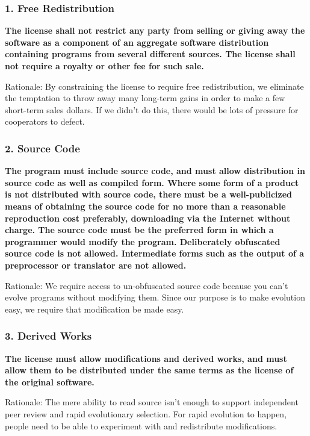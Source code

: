 
\begin{frame}
\frametitle{1. Free Redistribution}

{\bf 
The license shall not restrict any party from selling or giving away
the software as a component of an aggregate software distribution
containing programs from several different sources. The license shall
not require a royalty or other fee for such sale.}

\vspace{.2cm}
Rationale: By constraining the license to require free redistribution,
we eliminate the temptation to throw away many long-term gains in
order to make a few short-term sales dollars. If we didn't do this,
there would be lots of pressure for cooperators to defect.

\end{frame}


\begin{frame}
\frametitle{2. Source Code}

{\bf
The program must include source code, and must allow distribution in
source code as well as compiled form. Where some form of a product is
not distributed with source code, there must be a well-publicized
means of obtaining the source code for no more than a reasonable
reproduction cost preferably, downloading via the Internet without
charge. The source code must be the preferred form in which a
programmer would modify the program. Deliberately obfuscated source
code is not allowed. Intermediate forms such as the output of a
preprocessor or translator are not allowed.}

\vspace{.2cm}
Rationale: We require access to un-obfuscated source code because you
can't evolve programs without modifying them. Since our purpose is to
make evolution easy, we require that modification be made easy.

\end{frame}


\begin{frame}
\frametitle{3. Derived Works}

{\bf
The license must allow modifications and derived works, and must allow
them to be distributed under the same terms as the license of the
original software.}

\vspace{.2cm}
Rationale: The mere ability to read source isn't enough to support
independent peer review and rapid evolutionary selection. For rapid
evolution to happen, people need to be able to experiment with and
redistribute modifications.

\end{frame}

